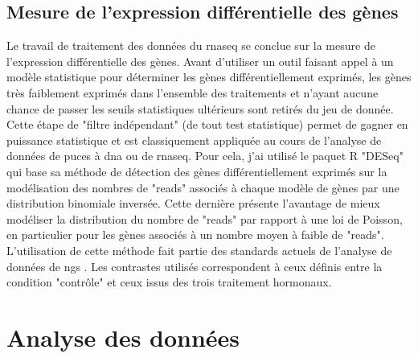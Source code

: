 \documentclass[../main.tex]{subfiles}
\begin{document}
\subsection{Mesure de l'expression différentielle des gènes}\label{subsec:diff-expr-call}
Le travail de traitement des données du \gls{rnaseq} se conclue sur la mesure de l'expression différentielle des gènes.
Avant d'utiliser un outil faisant appel à un modèle statistique pour déterminer les gènes différentiellement exprimés, les gènes très faiblement exprimés dans l'ensemble des traitements et n'ayant aucune chance de passer les seuils statistiques ultérieurs sont retirés du jeu de donnée.
Cette étape de "filtre indépendant" (de tout test statistique) permet de gagner en puissance statistique et est classiquement appliquée au cours de l'analyse de données de puces à \gls{dna} ou de \gls{rnaseq}.
Pour cela, j'ai utilisé le paquet R "DESeq" \citep{Anders2010} qui base sa méthode de détection des gènes différentiellement exprimés sur la modélisation des nombres de "reads" associés à chaque modèle de gènes par une distribution binomiale inversée.
Cette dernière présente l'avantage de mieux modéliser la distribution du nombre de "reads" par rapport à une loi de Poisson, en particulier pour les gènes associés à un nombre moyen à faible de "reads".
L’utilisation de cette méthode fait partie des standards actuels de l’analyse de données de \gls{ngs} \citep{Anders2013}.
Les contrastes utilisés correspondent à ceux définis entre la condition "contrôle" et ceux issus des trois traitement hormonaux.


\section{Analyse des données}
\end{document}
